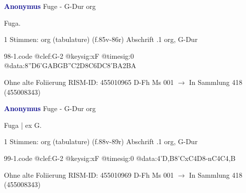 \documentclass[twocolumn]{book}
\begin{document}
\newline \par \vspace{7pt} \textcolor{darkblue}{\textbf{Anonymus  }}
\newline Fuge - G-Dur
\newline org
\newline \begin{itshape}[f.86r, at left:] Fuga.\end{itshape} 
\newline \textcolor{darkblue}{}  1 Stimmen: org (tabulature)  (f.85v-86r)
\newline Abschrift
.1  org, G-Dur  
\begin{filecontents*}{98-1.code}
@clef:G-2
@keysig:xF
@timesig:0
@data:{8''D6'GA}{BGB''C}2D{8C6DC}{8'BA}2BA
\end{filecontents*}
\newline
%
\newline Ohne alte Foliierung
\newline RISM-ID: 455010965
\newline D-Fh  Ms 001
\newline $\rightarrow$ In Sammlung 418 (455008343)
      
\newline \par \vspace{7pt} \textcolor{darkblue}{\textbf{Anonymus  }}
\newline Fuge - G-Dur
\newline org
\newline \begin{itshape}[f.88v, at left:] Fuga | ex G.\end{itshape} 
\newline \textcolor{darkblue}{}  1 Stimmen: org (tabulature)  (f.88v-89r)
\newline Abschrift
.1  org, G-Dur  
\begin{filecontents*}{99-1.code}
@clef:G-2
@keysig:xF
@timesig:0
@data:4'D,B{8'CxC}4D8-nC4C4,B
\end{filecontents*}
\newline
%
\newline Ohne alte Foliierung
\newline RISM-ID: 455010969
\newline D-Fh  Ms 001
\newline $\rightarrow$ In Sammlung 418 (455008343)
      
\end{document}
